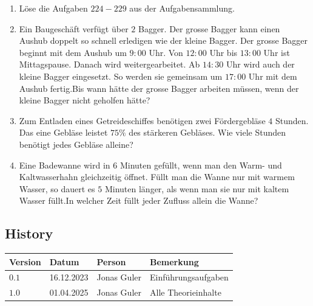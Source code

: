 \documentclass[11pt,oneside]{article}
\begin{document}
	\begin{aufgabe}
		\begin{enumerate}[label=\alph*)]
			\item Löse die Aufgaben $224-229$ aus der Aufgabensammlung.
			\item Ein Baugeschäft verfügt über $2$ Bagger. Der grosse Bagger kann einen Aushub doppelt so schnell erledigen wie der kleine Bagger. Der grosse Bagger beginnt mit dem Aushub um $9:00$ Uhr. Von $12:00$ Uhr bis $13:00$ Uhr ist Mittagspause. Danach wird weitergearbeitet. Ab $14:30$ Uhr wird auch der kleine Bagger eingesetzt. So werden sie gemeinsam um $17:00$ Uhr mit dem Aushub fertig.\newline Bis wann hätte der grosse Bagger arbeiten müssen, wenn der kleine Bagger nicht geholfen hätte?
			\item Zum Entladen eines Getreideschiffes benötigen zwei Fördergebläse $4$ Stunden. Das eine Gebläse leistet $75\%$ des stärkeren Gebläses. Wie viele Stunden benötigt jedes Gebläse alleine?
			\item Eine Badewanne wird in $6$ Minuten gefüllt, wenn man den Warm- und Kaltwasserhahn gleichzeitig öffnet. Füllt man die Wanne nur mit warmem Wasser, so dauert es $5$ Minuten länger, als wenn man sie nur mit kaltem Wasser füllt.\newline In welcher Zeit füllt jeder Zufluss allein die Wanne?
		\end{enumerate}
	\end{aufgabe}


\newpage
\subsection*{History}
\begingroup
\renewcommand{\arraystretch}{1.5}
\begin{table}[H]
    \centering
    \begin{tabular}{|p{13mm}|p{20mm}|p{30mm}|p{70mm}|}\hline
        Version & Datum & Person & Bemerkung \\\hline
        $0.1$ & 16.12.2023 & Jonas Guler & Einführungsaufgaben \\\hline
        $1.0$ & 01.04.2025 & Jonas Guler & Alle Theorieinhalte \\\hline
    \end{tabular}
\end{table}
\endgroup
\end{document}
